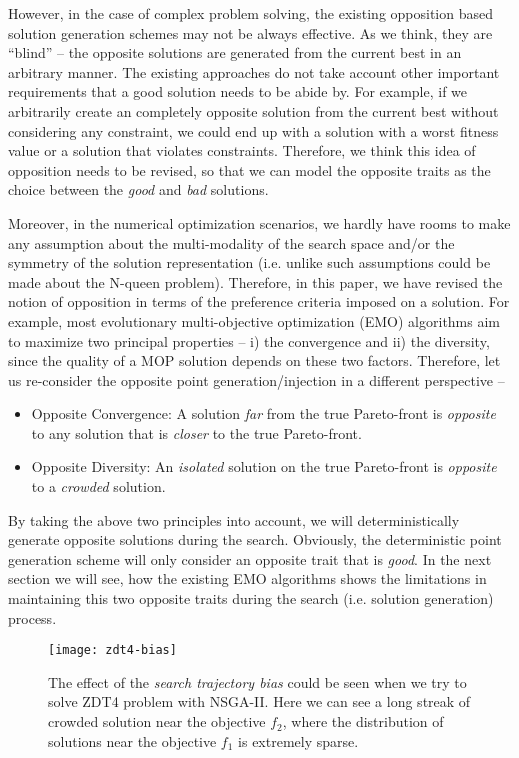 \documentclass{sig-alternate-05-2015}
\begin{document}
However, in the case of complex problem solving, the existing opposition based solution generation schemes may not be always effective. As we think, they are ``blind'' -- the opposite solutions are generated from the current best in an arbitrary manner. The existing approaches do not take account other important requirements that a good solution needs to be abide by. For example, if we arbitrarily create an completely opposite solution from the current best without considering any constraint, we could end up with a solution with a worst fitness value or a solution that violates constraints. Therefore, we think this idea of opposition needs to be revised, so that we can model the opposite traits as the choice between the \textit{good} and \textit{bad} solutions.

Moreover, in the numerical optimization scenarios, we hardly have rooms to make any assumption about the multi-modality of the search space and/or the symmetry of the solution representation (i.e. unlike such assumptions could be made about the N-queen problem). Therefore, in this paper, we have revised the notion of opposition in terms of the preference criteria imposed on a solution. For example, most evolutionary multi-objective optimization (EMO) algorithms aim to maximize two principal properties -- i) the convergence and ii) the diversity, since the quality of a MOP solution depends on these two factors. Therefore, let us re-consider the opposite point generation/injection in a different perspective --
\begin{itemize}
	\item Opposite Convergence: A solution \textit{far} from the true Pareto-front is \textit{opposite} to any solution that is \textit{closer} to the true Pareto-front.
	\item Opposite Diversity: An \textit{isolated} solution on the true Pareto-front is \textit{opposite} to a \textit{crowded} solution. 
\end{itemize}

By taking the above two principles into account, we will deterministically generate opposite solutions during the search. Obviously, the deterministic point generation scheme will only consider an opposite trait that is \textit{good}. In the next section we will see, how the existing EMO algorithms shows the limitations in maintaining this two opposite traits during the search (i.e. solution generation) process.  

\begin{figure}[!pb]
	\centering
	\texttt{[image: zdt4-bias]}
	\caption{The effect of the \textit{search trajectory bias} could be seen when we try to solve ZDT4 problem with NSGA-II. Here we can see a long streak of crowded solution near the objective \(f_2\), where the distribution of solutions near the objective \(f_1\) is extremely sparse.}
	\label{fig:zdt4-unbalanced-snapshot}
\end{figure}
%
\end{document}
